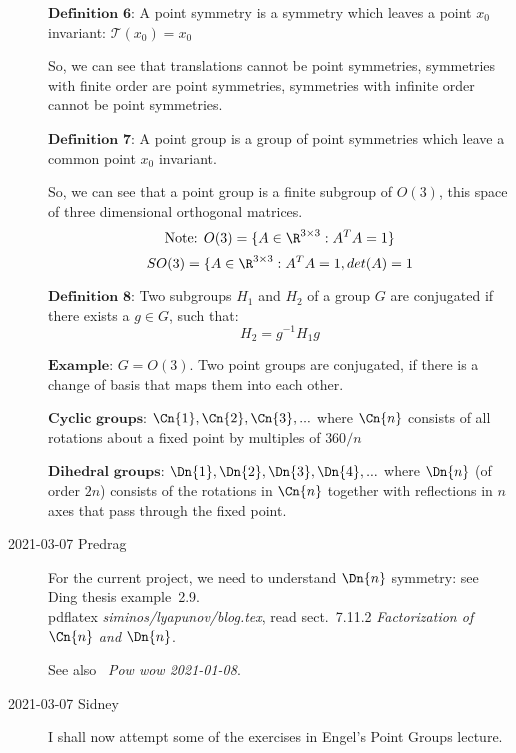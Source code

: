 \begin{description}
$\textbf{Definition 6}$: A point symmetry is a symmetry which leaves a point $x_0$ invariant: $\mathcal{T}(x_0)=x_0$

So, we can see that translations cannot be point symmetries, symmetries with finite order are point symmetries, symmetries with infinite order cannot be point symmetries.

$\textbf{Definition 7}$: A point group is a group of point symmetries which leave a common point $x_0$ invariant.

So, we can see that a point group is a finite subgroup of $O(3)$, this space of three dimensional orthogonal matrices.
$$\text{Note:  }O(3)=\lbrace A\in\R^{3\times3}:A^TA=1\rbrace$$
$$SO(3)=\lbrace A\in\R^{3\times3}:A^TA=1, det(A)=1$$

$\textbf{Definition 8:}$ Two subgroups $H_1$ and $H_2$ of a group $G$ are conjugated if there exists a $g\in G$, such that:
$$H_2=g^{-1}H_1g$$

$\textbf{Example}$: $G=O(3)$. Two point groups are conjugated, if there is a change of basis that maps them into each other.

$\textbf{Cyclic groups}$: $\Cn{1},\Cn{2},\Cn{3},...$ where $\Cn{n}$ consists of all rotations about a fixed point by multiples of $360/n$

$\textbf{Dihedral groups}$: $\Dn{1},\Dn{2},\Dn{3},\Dn{4},...$ where $\Dn{n}$
(of order $2n$) consists of the rotations in $\Cn{n}$ together with
reflections in $n$ axes that pass through the fixed point.

\item[2021-03-07 Predrag]
For the current project, we need to understand
$\Dn{n}$ symmetry: see
{Ding thesis example~2.9.}\\
pdflatex \emph{siminos/lyapunov/blog.tex}, read sect.~7.11.2
\emph{Factorization of $\Cn{n}$ and $\Dn{n}$}.

See also ~{\em Pow wow 2021-01-08}.



\item[2021-03-07 Sidney]
I shall now attempt
some of the exercises in Engel's
{Point Groups} lecture.


\end{description}
